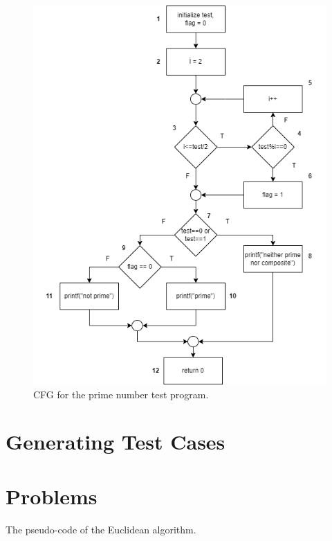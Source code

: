 \begin{figure}[!ht]
    \includegraphics{images/cfg-36.png}
    \caption{CFG for the prime number test program.}
\end{figure}


\section{Generating Test Cases}

\section{Problems}

\begin{algorithm}
\DontPrintSemicolon
{}


\caption{The pseudo-code of the Euclidean algorithm.}
\label{euclidean-algo}
\end{algorithm}

